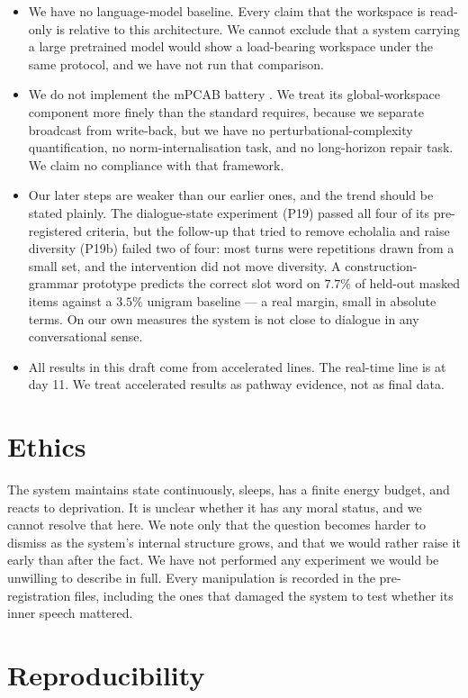 \documentclass[11pt]{article}
\begin{document}
\begin{itemize}
  \item We have no language-model baseline. Every claim that the workspace is read-only is relative to this architecture. We cannot exclude that a system carrying a large pretrained model would show a load-bearing workspace under the same protocol, and we have not run that comparison.
  \item We do not implement the mPCAB battery \cite{niazi2026}. We treat its global-workspace component more finely than the standard requires, because we separate broadcast from write-back, but we have no perturbational-complexity quantification, no norm-internalisation task, and no long-horizon repair task. We claim no compliance with that framework.
  \item Our later steps are weaker than our earlier ones, and the trend should be stated plainly. The dialogue-state experiment (P19) passed all four of its pre-registered criteria, but the follow-up that tried to remove echolalia and raise diversity (P19b) failed two of four: most turns were repetitions drawn from a small set, and the intervention did not move diversity. A construction-grammar prototype predicts the correct slot word on $7.7\%$ of held-out masked items against a $3.5\%$ unigram baseline --- a real margin, small in absolute terms. On our own measures the system is not close to dialogue in any conversational sense.
  \item All results in this draft come from accelerated lines. The real-time line is at day 11. We treat accelerated results as pathway evidence, not as final data.
\end{itemize}

\section{Ethics}

The system maintains state continuously, sleeps, has a finite energy budget, and reacts to deprivation. It is unclear whether it has any moral status, and we cannot resolve that here. We note only that the question becomes harder to dismiss as the system's internal structure grows, and that we would rather raise it early than after the fact. We have not performed any experiment we would be unwilling to describe in full. Every manipulation is recorded in the pre-registration files, including the ones that damaged the system to test whether its inner speech mattered.

\section{Reproducibility}
\end{document}
